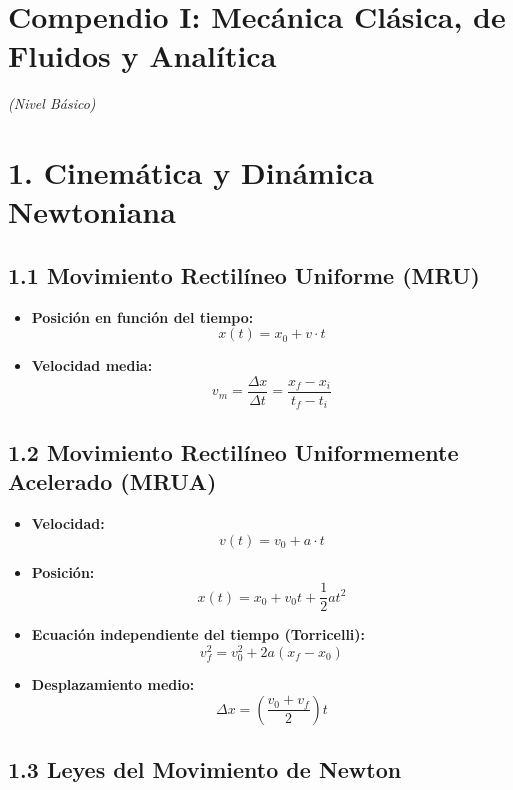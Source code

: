 \documentclass[11pt,a4paper]{article}
\begin{document}
\section*{Compendio I: Mecánica Clásica, de Fluidos y Analítica}

\textit{(Nivel Básico)}

\section*{1. Cinemática y Dinámica Newtoniana}

\subsection*{1.1 Movimiento Rectilíneo Uniforme (MRU)}

\begin{itemize}
  \item \textbf{Posición en función del tiempo:}
  \[
    x(t) = x_0 + v \cdot t
  \]
  \item \textbf{Velocidad media:}
  \[
    v_m = \frac{\Delta x}{\Delta t} = \frac{x_f - x_i}{t_f - t_i}
  \]
\end{itemize}

\subsection*{1.2 Movimiento Rectilíneo Uniformemente Acelerado (MRUA)}

\begin{itemize}
  \item \textbf{Velocidad:}
  \[
    v(t) = v_0 + a \cdot t
  \]
  \item \textbf{Posición:}
  \[
    x(t) = x_0 + v_0 t + \frac{1}{2} a t^2
  \]
  \item \textbf{Ecuación independiente del tiempo (Torricelli):}
  \[
    v_f^2 = v_0^2 + 2a (x_f - x_0)
  \]
  \item \textbf{Desplazamiento medio:}
  \[
    \Delta x = \left( \frac{v_0 + v_f}{2} \right) t
  \]
\end{itemize}

\subsection*{1.3 Leyes del Movimiento de Newton}
\end{document}
